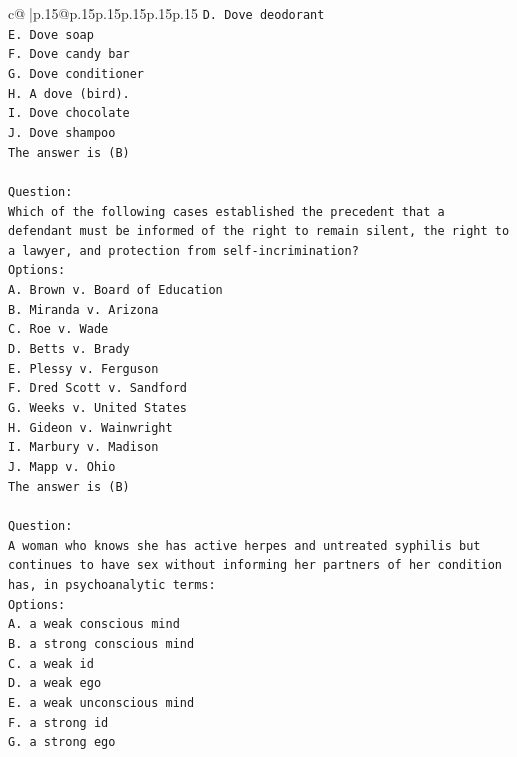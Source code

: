 \documentclass{article}
\begin{document}
{\begin{supertabular}{c@{$\;$}|p{.15\linewidth}@{}p{.15\linewidth}p{.15\linewidth}p{.15\linewidth}p{.15\linewidth}p{.15\linewidth}}
{{{\texttt{D. Dove deodorant} \\
\texttt{E. Dove soap} \\
\texttt{F. Dove candy bar} \\
\texttt{G. Dove conditioner} \\
\texttt{H. A dove (bird).} \\
\texttt{I. Dove chocolate} \\
\texttt{J. Dove shampoo} \\
\texttt{The answer is (B)} \\
\\ 
\texttt{Question:} \\
\texttt{Which of the following cases established the precedent that a defendant must be informed of the right to remain silent, the right to a lawyer, and protection from self{-}incrimination?} \\
\texttt{Options:} \\
\texttt{A. Brown v. Board of Education} \\
\texttt{B. Miranda v. Arizona} \\
\texttt{C. Roe v. Wade} \\
\texttt{D. Betts v. Brady} \\
\texttt{E. Plessy v. Ferguson} \\
\texttt{F. Dred Scott v. Sandford} \\
\texttt{G. Weeks v. United States} \\
\texttt{H. Gideon v. Wainwright} \\
\texttt{I. Marbury v. Madison} \\
\texttt{J. Mapp v. Ohio} \\
\texttt{The answer is (B)} \\
\\ 
\texttt{Question:} \\
\texttt{A woman who knows she has active herpes and untreated syphilis but continues to have sex without informing her partners of her condition has, in psychoanalytic terms:} \\
\texttt{Options:} \\
\texttt{A. a weak conscious mind} \\
\texttt{B. a strong conscious mind} \\
\texttt{C. a weak id} \\
\texttt{D. a weak ego} \\
\texttt{E. a weak unconscious mind} \\
\texttt{F. a strong id} \\
\texttt{G. a strong ego} \\
}}}
\end{supertabular}}
\end{document}
